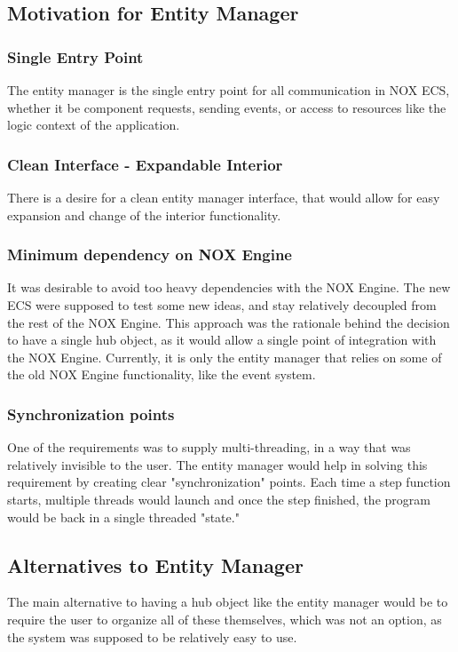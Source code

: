 \subsection{Motivation for Entity Manager}
\subsubsection{Single Entry Point}
The entity manager is the single entry point for all communication in NOX ECS,
whether it be component requests, sending events, or access to resources like the
logic context of the application.

\subsubsection{Clean Interface - Expandable Interior}
There is a desire for a clean entity manager interface, that would allow for easy expansion and change of the interior functionality.

\subsubsection{Minimum dependency on NOX Engine}
It was desirable to avoid too heavy dependencies with the NOX Engine.
The new ECS were supposed to test some new ideas, and stay relatively decoupled from
the rest of the NOX Engine.
This approach was the rationale behind the decision to have a single hub object, as it would allow a single point of integration with the NOX Engine.
Currently, it is only the entity manager that relies on some of the old NOX Engine functionality, like the event system.

\subsubsection{Synchronization points}
One of the requirements was to supply multi-threading, in a way that was relatively invisible to the user.
The entity manager would help in solving this requirement by creating clear "synchronization" points.
Each time a step function starts, multiple threads would launch
and once the step finished, the program would be back in a single threaded "state."

\subsection{Alternatives to Entity Manager}
The main alternative to having a hub object like the entity manager would be to require
the user to organize all of these themselves, which was not an option, as the system was supposed to be relatively easy to use.

